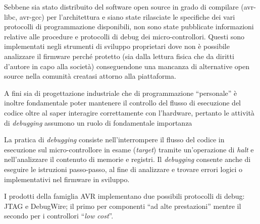 Sebbene sia stato distribuito del software open source in grado di compilare (avr-libc\cite{site:avr-libc}, avr-gcc\cite{site:avr-gcc}) per l'architettura e siano state rilasciate le specifiche dei vari protocolli di programmazione disponibili\cite{avr:appnote:isp}\cite{avr:appnote:tpi}\cite{avr:appnote:pdi}, non sono state pubblicate informazioni relative alle procedure e protocolli di debug dei micro-controllori. 
Questi sono implementati negli strumenti di sviluppo proprietari dove non è possibile analizzare il firmware perché protetto (sia dalla lettura fisica che da diritti d'autore in capo alla società) conseguendone una mancanza di alternative open source nella comunità creatasi attorno alla piattaforma.

A fini sia di progettazione industriale che di programmazione ``personale'' è inoltre fondamentale poter mantenere il controllo del flusso di esecuzione del codice oltre al saper interagire correttamente con l'hardware, pertanto le attività di \textit{debugging} assumono un ruolo di fondamentale importanza

La pratica di \textit{debugging} consiste nell'interrompere il flusso del codice in esecuzione sul micro-controllore in esame (\textit{target}) tramite un'operazione di \textit{halt} e nell'analizzare il contenuto di memorie e registri. Il \textit{debugging} consente anche di eseguire le istruzioni passo-passo, al fine di analizzare e trovare errori logici o implementativi nel firmware in sviluppo.

I prodotti della famiglia AVR implementano due possibili protocolli di debug: JTAG e DebugWire; il primo per componenti ``ad alte prestazioni'' mentre il secondo per i controllori ``\textit{low cost}''.

